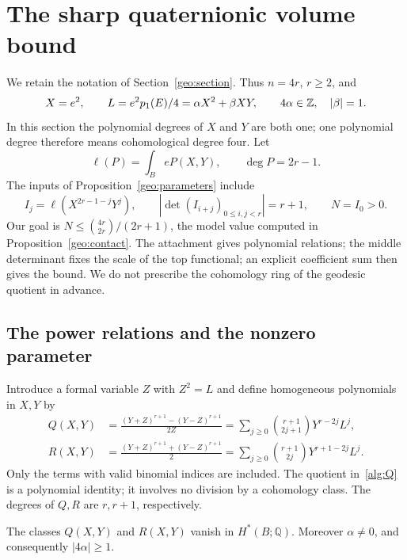 \section{The sharp quaternionic volume bound}
\label{alg:section}

We retain the notation of Section~\ref{geo:section}.  Thus $n=4r$,
$r\ge2$, and
\[
 X=e^2,\qquad L=e^2p_1(E)/4=\alpha X^2+\beta XY,
 \qquad 4\alpha\in\mathbb Z,\quad |\beta|=1.
\]
In this section the polynomial degrees of $X$ and $Y$ are both one;
one polynomial degree therefore means cohomological degree four.
Let
\begin{equation}
 \ell(P)=\int_{B} eP(X,Y),
 \qquad \deg P=2r-1.
 \label{alg:functional}
\end{equation}
The inputs of Proposition~\ref{geo:parameters} include
\begin{equation}
 I_j=\ell(X^{2r-1-j}Y^j),\qquad
 \left|\det(I_{i+j})_{0\le i,j<r}\right|=r+1,
 \qquad N=I_0>0.
 \label{alg:middle-input}
\end{equation}
Our goal is
$N\le\binom{4r}{2r}/(2r+1)$, the model value computed in
Proposition~\ref{geo:contact}. The attachment gives polynomial
relations; the middle determinant fixes the scale of the top
functional; an explicit coefficient sum then gives the bound.
We do not prescribe the cohomology ring of the geodesic quotient
in advance.

\subsection{The power relations and the nonzero parameter}

Introduce a formal variable $Z$ with $Z^2=L$ and define homogeneous
polynomials in $X,Y$ by
\begin{align}
 Q(X,Y)&=\frac{(Y+Z)^{r+1}-(Y-Z)^{r+1}}{2Z}
   =\sum_{j\ge0}\binom{r+1}{2j+1}Y^{r-2j}L^j,
   \label{alg:Q}\\
 R(X,Y)&=\frac{(Y+Z)^{r+1}+(Y-Z)^{r+1}}2
   =\sum_{j\ge0}\binom{r+1}{2j}Y^{r+1-2j}L^j.
   \label{alg:R}
\end{align}
Only the terms with valid binomial indices are included.  The quotient
in~\eqref{alg:Q} is a polynomial identity; it involves no division by a
cohomology class.  The degrees of $Q,R$ are $r,r+1$, respectively.

\begin{lemma}
\label{alg:relations}
The classes $Q(X,Y)$ and $R(X,Y)$ vanish in
$H^*(B;\mathbb Q)$.  Moreover $\alpha\ne0$, and consequently
$|4\alpha|\ge1$.
\end{lemma}

